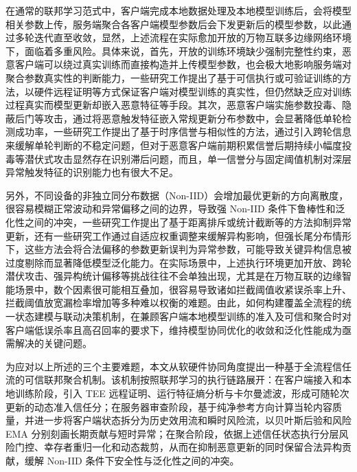 \documentclass[11pt, a4paper, UTF8, fontset=fandol]{ctexart}
\begin{document}
在通常的联邦学习范式中，客户端完成本地数据处理及本地模型训练后，会将模型相关参数上传，服务端聚合各客户端模型参数后会下发更新后的模型参数，以此通过多轮迭代直至收敛，显然，上述流程在实际愈加开放的万物互联多边缘网络环境下，面临着多重风险。具体来说，首先，开放的训练环境缺少强制完整性约束，恶意客户端可以绕过真实训练而直接构造并上传模型参数，也会极大地影响服务端对聚合参数真实性的判断能力，一些研究工作提出了基于可信执行或可验证训练的方法\cite{lu2025tmt,zhang2025rppfl,r1_tee_integrity}，以硬件远程证明等方式保证客户端对模型训练的真实性，但仍然缺乏应对训练过程真实而模型更新却嵌入恶意特征等手段。其次，恶意客户端实施参数投毒、隐蔽后门等攻击\cite{bagdasaryan2020backdoor,wang2019neuralcleanse}，通过将恶意触发特征嵌入常规更新分布参数中，会显著降低单轮检测成功率，一些研究工作提出了基于时序信誉与相似性的方法\cite{cao2021fltrust,fung2020foolsgold}，通过引入跨轮信息来缓解单轮判断的不稳定问题，但对于恶意客户端前期积累信誉后期持续小幅度投毒等潜伏式攻击显然存在识别滞后问题，而且，单一信誉分与固定阈值机制对深层异常触发特征的识别能力也有很大不足。

另外，不同设备的非独立同分布数据（Non-IID）会增加最优更新的方向离散度，很容易模糊正常波动和异常偏移之间的边界，导致强 Non-IID 条件下鲁棒性和泛化性之间的冲突，一些研究工作提出了基于距离排斥或统计截断等的方法抑制异常更新\cite{blanchard2017krum,yin2018byzantine}，还有一些研究工作通过自适应权重调整来缓解异构影响\cite{wang2025rasa}，但强长尾分布情形下，这些方法会将合法偏移的参数更新误判为异常参数，可能导致关键异构信息被过度剔除而显著降低模型泛化能力。在实际场景中，上述执行环境更加开放、跨轮潜伏攻击、强异构统计偏移等挑战往往不会单独出现，尤其是在万物互联的边缘智能场景中，数个因素很可能相互叠加，很容易导致诸如拦截阈值收紧误杀率上升、拦截阈值放宽漏检率增加等多种难以权衡的难题。由此，如何构建覆盖全流程的统一状态建模与联动决策机制，在兼顾客户端本地模型训练的准入及可信和聚合时对客户端低误杀率且高召回率的要求下，维持模型协同优化的收敛和泛化性能成为亟需解决的关键问题。

为应对以上所述的三个主要难题，本文从软硬件协同角度提出一种基于全流程信任流的可信联邦聚合机制。该机制按照联邦学习的执行链路展开：在客户端接入和本地训练阶段，引入 TEE 远程证明、运行特征熵分析与卡尔曼滤波，形成可随轮次更新的动态准入信任分；在服务器审查阶段，基于纯净参考方向计算当轮内容质量，并进一步将客户端状态拆分为历史效用流和瞬时风险流，以贝叶斯后验和风险 EMA 分别刻画长期贡献与短时异常；在聚合阶段，依据上述信任状态执行分层风险门控、幸存者重归一化和动态裁剪，从而在抑制恶意更新的同时保留合法异构贡献，缓解 Non-IID 条件下安全性与泛化性之间的冲突。
\end{document}
